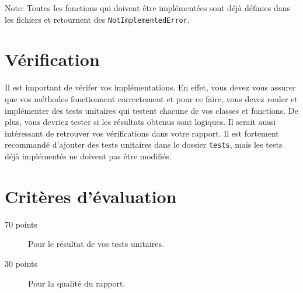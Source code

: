 \documentclass[12pt, letterpaper]{article}
\begin{document}
\bigskip

\noindent Note: Toutes les fonctions qui doivent être implémentées sont déjà définies dans les fichiers
et retournent des \texttt{NotImplementedError}.


\section{Vérification}\label{sec:verification}

\noindent Il est important de vérifer vos implémentations.
En effet, vous devez vous assurer que vos méthodes fonctionnent correctement et pour ce faire, vous devez rouler et
implémenter des tests unitaires qui testent chacune de vos classes et fonctions.
De plus, vous devriez tester si les résultats obtenus sont logiques.
Il serait aussi intéressant de retrouver vos vérifications dans votre rapport.
Il est fortement recommandé d'ajouter des tests unitaires dans le dossier \texttt{tests}, mais les tests déjà
implémentés ne doivent pas être modifiés.


\section{Critères d'évaluation}\label{sec:criteres-d'evaluation}

\begin{description}
  \item[70 points] Pour le résultat de vos tests unitaires.
  \item[30 points] Pour la qualité du rapport.
\end{description}
\end{document}
